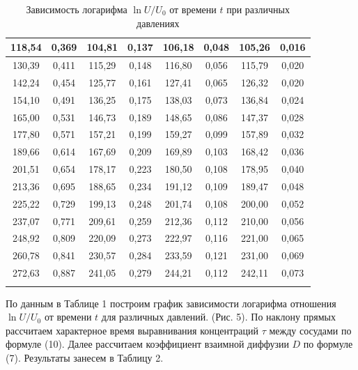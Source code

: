 \documentclass[a4paper,12pt]{article}
\theoremstyle{plain} %
\theoremstyle{definition} %
\theoremstyle{remark} %
\begin{document}
\begin{longtable}{|c|c|c|c|c|c|c|c|}
118,54 & 0,369    & 104,81 & 0,137    & 106,18 & 0,048    & 105,26 & 0,016    \\ \hline
130,39 & 0,411    & 115,29 & 0,148    & 116,80 & 0,056    & 115,79 & 0,020    \\ \hline
142,24 & 0,454    & 125,77 & 0,161    & 127,41 & 0,065    & 126,32 & 0,020    \\ \hline
154,10 & 0,491    & 136,25 & 0,175    & 138,03 & 0,073    & 136,84 & 0,024    \\ \hline
165,00 & 0,531    & 146,73 & 0,189    & 148,65 & 0,086    & 147,37 & 0,028    \\ \hline
177,80 & 0,571    & 157,21 & 0,199    & 159,27 & 0,099    & 157,89 & 0,032    \\ \hline
189,66 & 0,614    & 167,69 & 0,209    & 169,89 & 0,103    & 168,42 & 0,036    \\ \hline
201,51 & 0,654    & 178,17 & 0,223    & 180,50 & 0,108    & 178,95 & 0,040    \\ \hline
213,36 & 0,695    & 188,65 & 0,234    & 191,12 & 0,109    & 189,47 & 0,048    \\ \hline
225,22 & 0,729    & 199,13 & 0,248    & 201,74 & 0,108    & 200,00 & 0,052    \\ \hline
237,07 & 0,771    & 209,61 & 0,259    & 212,36 & 0,112    & 210,00 & 0,056    \\ \hline
248,92 & 0,809    & 220,09 & 0,273    & 222,97 & 0,116    & 221,00 & 0,065    \\ \hline
260,78 & 0,841    & 230,57 & 0,284    & 233,59 & 0,121    & 231,00 & 0,069    \\ \hline
272,63 & 0,887    & 241,05 & 0,279    & 244,21 & 0,112    & 242,11 & 0,073    \\ \hline
		\caption{Зависимость логарифма  $\ln U/U_0$ от времени $t$ при различных давлениях}
\end{longtable}
\renewcommand{\arraystretch}{1}
По данным в Таблице 1 построим график зависимости логарифма отношения $\ln U/U_0$ от времени $t$ для различных давлений. (Рис. 5). По наклону прямых рассчитаем характерное время выравнивания концентраций $\tau$ между сосудами по формуле (10). Далее рассчитаем коэффициент взаимной диффузии $D$ по формуле (7). Результаты занесем в Таблицу 2.
\end{document}
